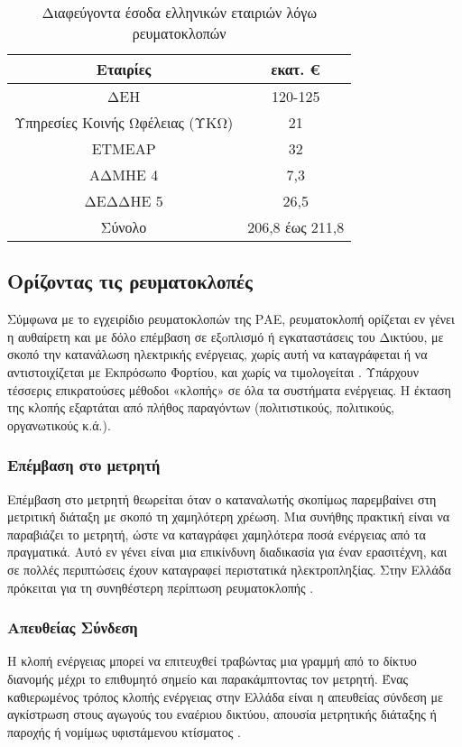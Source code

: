 \begin{table}[ht!]
\centering
\begin{tabular}{ |c||c|  }
 \hline
 Εταιρίες & εκατ. \euro\\
 \hline
 ΔΕΗ & 120-125\\
 Υπηρεσίες Κοινής Ωφέλειας (ΥΚΩ) & 21\\
 ΕΤΜΕΑΡ & 32\\
 ΑΔΜΗΕ 4 & 7,3\\
 ΔΕΔΔΗΕ 5 & 26,5\\
 \hline
 Σύνολο& 206,8 έως 211,8\\
 \hline
\end{tabular}
\caption{Διαφεύγοντα έσοδα ελληνικών εταιριών λόγω ρευματοκλοπών}
\label{tab:lostearnings}
\end{table}
\subsection{Ορίζοντας τις ρευματοκλοπές}
Σύμφωνα με το εγχειρίδιο ρευματοκλοπών της ΡΑΕ, ρευματοκλοπή ορίζεται εν γένει η αυθαίρετη και με δόλο επέμβαση σε εξoπλισμό ή εγκαταστάσεις του Δικτύου, με σκοπό την κατανάλωση ηλεκτρικής ενέργειας, χωρίς αυτή να καταγράφεται ή να αντιστοιχίζεται με Εκπρόσωπο Φορτίου, και χωρίς να τιμολογείται \cite{rae}. Υπάρχουν τέσσερις επικρατούσες μέθοδοι «κλοπής» σε όλα τα συστήματα ενέργειας. Η έκταση της κλοπής εξαρτάται από πλήθος παραγόντων (πολιτιστικούς, πολιτικούς, οργανωτικούς κ.ά.). 

\subsubsection{Επέμβαση στο μετρητή}
Επέμβαση στο μετρητή θεωρείται όταν ο καταναλωτής σκοπίμως παρεμβαίνει στη μετριτική διάταξη με σκοπό τη χαμηλότερη χρέωση. Μια συνήθης πρακτική είναι να παραβιάζει το μετρητή, ώστε να καταγράφει χαμηλότερα ποσά ενέργειας από τα πραγματικά. Αυτό εν γένει είναι μια  επικίνδυνη διαδικασία για έναν ερασιτέχνη, και σε πολλές περιπτώσεις έχουν καταγραφεί περιστατικά ηλεκτροπληξίας. Στην Ελλάδα πρόκειται για τη συνηθέστερη περίπτωση ρευματοκλοπής \cite{rae}.
\subsubsection{Απευθείας Σύνδεση}
Η κλοπή ενέργειας μπορεί να επιτευχθεί τραβώντας μια γραμμή από το δίκτυο διανομής μέχρι το επιθυμητό σημείο και παρακάμπτοντας τον μετρητή. Ένας καθιερωμένος τρόπος κλοπής ενέργειας στην Ελλάδα είναι η απευθείας σύνδεση με αγκίστρωση στους αγωγούς του εναέριου δικτύου, απουσία μετρητικής διάταξης ή παροχής ή νομίμως υφιστάμενου κτίσματος \cite{rae}.
